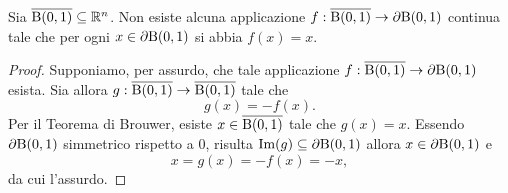 \begin{corollario}
	Sia $\overline{\textup{B}(0,1)} \subseteq \mathbb{R}^n$. Non esiste alcuna applicazione $f: \overline{\textup{B}(0,1)} \to \partial \textup{B}(0,1)$ continua tale che per ogni $x \in \partial \textup{B}(0,1)$ si abbia $f(x) = x$.
\end{corollario}
\begin{proof}
	Supponiamo, per assurdo, che tale applicazione $f: \overline{\textup{B}(0,1)} \to \partial \textup{B}(0,1)$ esista. Sia allora $g: \overline{\textup{B}(0,1)} \to \overline{\textup{B}(0,1)}$ tale che
	\[ g(x) = -f(x). \]
	Per il Teorema di Brouwer, esiste $x \in \overline{\textup{B}(0,1)}$ tale che $g(x) = x$. Essendo $\partial \textup{B}(0,1)$ simmetrico rispetto a $0$, risulta $\textup{Im}(g) \subseteq \partial \textup{B}(0,1)$ allora $x \in \partial \textup{B}(0,1)$ e \[ x = g(x) = -f(x) = -x, \] 
	da cui l'assurdo.
\end{proof}

